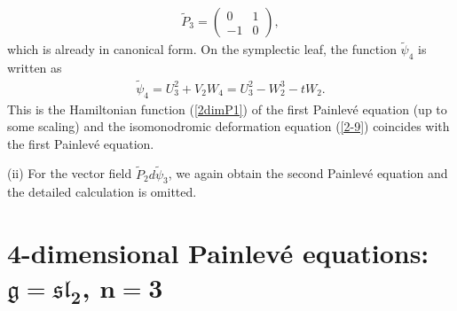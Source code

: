 \documentclass[pdftex]{sigma}
\numberwithin{equation}{section}
\begin{document}
\begin{gather*}
\widetilde{P}_3 = \left(
\begin{matrix}
0 & 1 \\
-1 & 0
\end{matrix}
\right),
\end{gather*}
which is already in canonical form. On the symplectic leaf, the function $\widetilde{\psi}_4$ is written as
\begin{gather*}
\widetilde{\psi}_4 = U_3^2 + V_2W_4 = U_3^2 - W_2^3 - tW_2.
\end{gather*}
This is the Hamiltonian function (\ref{2dimP1}) of the f\/irst Painlev\'{e} equation (up to some scaling) and the isomonodromic deformation equation (\ref{2-9}) coincides with the f\/irst Painlev\'{e} equation.

(ii) For the vector f\/ield $\widetilde{P}_2 d\widetilde{\psi}_3$, we again obtain the second Painlev\'{e} equation and the detailed calculation is omitted.

\section[4-dimensional Painlev\'{e} equations: $\mathfrak{g} = \mathfrak{sl}_2$, $n=3$]{4-dimensional Painlev\'{e} equations: $\boldsymbol{\mathfrak{g} = \mathfrak{sl}_2}$, $\boldsymbol{n=3}$}\label{section4}
\end{document}
